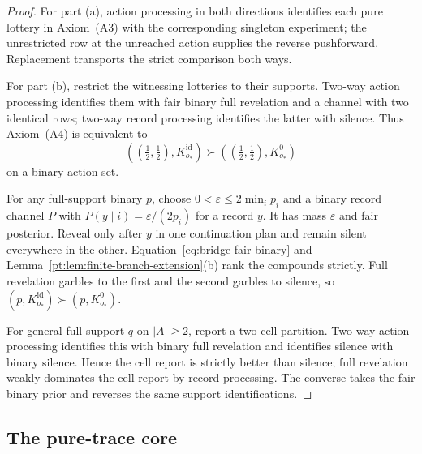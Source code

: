 \documentclass[11pt,a4paper]{article}
\theoremstyle{definition}
\newcommand{\1}{\mathbf 1}
\begin{document}
\begin{proof}
For part \textup{(a)}, action processing in both directions identifies each
pure lottery in Axiom~\textup{(A3)} with the corresponding singleton
experiment; the unrestricted row at the unreached action supplies the reverse
pushforward.  Replacement transports the strict comparison both ways.

For part \textup{(b)}, restrict the witnessing lotteries to their supports.
Two-way action processing identifies them with fair binary full revelation
and a channel with two identical rows; two-way record processing identifies
the latter with silence.  Thus Axiom~\textup{(A4)} is equivalent to
\begin{equation}
  ((\tfrac12,\tfrac12),K^{\mathrm{id}}_{o_\ast})
  \succ
  ((\tfrac12,\tfrac12),K^0_{o_\ast})
  \label{eq:bridge-fair-binary}
\end{equation}
on a binary action set.

For any full-support binary $p$, choose
$0<\varepsilon\le2\min_i p_i$ and a binary record channel $P$ with
$P(y\mid i)=\varepsilon/(2p_i)$ for a record $y$.  It has mass $\varepsilon$ and fair
posterior.  Reveal only after $y$ in one continuation plan and remain silent
everywhere in the other.  Equation~\eqref{eq:bridge-fair-binary} and
Lemma~\ref{pt:lem:finite-branch-extension}\textup{(b)} rank the compounds strictly.  Full
revelation garbles to the first and the second garbles to silence, so
$(p,K^{\mathrm{id}}_{o_\ast})\succ(p,K^0_{o_\ast})$.

For general full-support $q$ on $|A|\ge2$, report a two-cell partition.
Two-way action processing identifies this with binary full revelation and
identifies silence with binary silence.  Hence the cell report is strictly
better than silence; full revelation weakly dominates the cell report by
record processing.  The converse takes the fair binary prior and reverses
the same support identifications.
\end{proof}

\subsection{The pure-trace core}
\label{pt:sec:environment}\label{lf:app:pure-trace}
\end{document}
